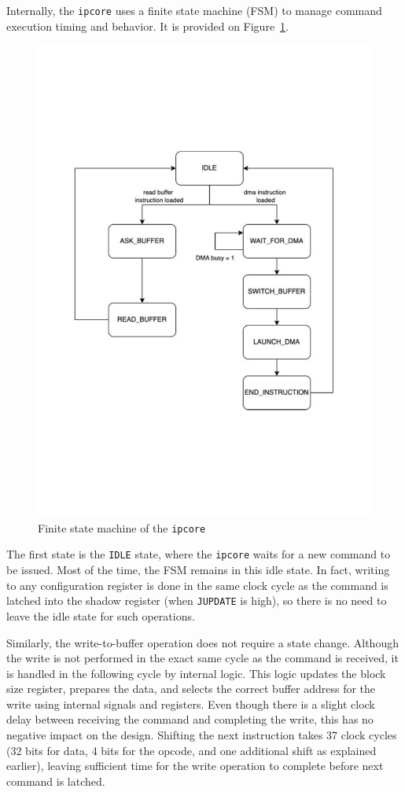 \documentclass[a4paper,11pt,oneside]{report}
\begin{document}
Internally, the \texttt{ipcore} uses a finite state machine (FSM) to manage command execution timing and behavior. It is provided on Figure~\ref{fig:ipcore_fsm}.

\begin{figure}
    \centering
    \includegraphics[width=0.9\linewidth]{figures/ipcore_fsm.pdf}
    \caption{Finite state machine of the \texttt{ipcore}}
    \label{fig:ipcore_fsm}
\end{figure}

The first state is the \texttt{IDLE} state, where the \texttt{ipcore} waits for a new command to be issued.
Most of the time, the FSM remains in this idle state. In fact, writing to any configuration register is done
in the same clock cycle as the command is latched into the shadow register (when \texttt{JUPDATE} is high),
so there is no need to leave the idle state for such operations.

Similarly, the write-to-buffer operation does not require a state change.
Although the write is not performed in the exact same cycle as the command is received,
it is handled in the following cycle by internal logic. This logic updates the block size register,
prepares the data, and selects the correct buffer address for the write using internal signals and registers.
Even though there is a slight clock delay between receiving the command and completing the write,
this has no negative impact on the design. Shifting the next instruction takes 37 clock cycles
(32 bits for data, 4 bits for the opcode, and one additional shift as explained earlier),
leaving sufficient time for the write operation to complete before next command is latched.
\end{document}
